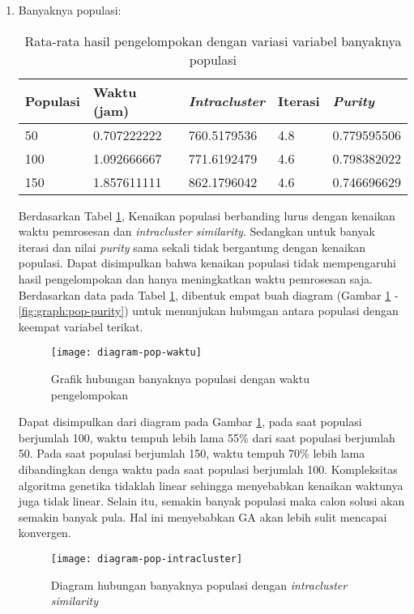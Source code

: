 \begin{enumerate}
	\item Banyaknya populasi:
		\begin{table}[H]
			\centering
			\begin{tabular}{|l|l|l|l|l|} \hline
				Populasi & Waktu (jam) & \textit{Intracluster} & Iterasi& \textit{Purity} \\ \hline
				50  & 0.707222222 & 760.5179536 & 4.8 & 0.779595506 \\ \hline
				100 & 1.092666667 & 771.6192479 & 4.6 & 0.798382022 \\ \hline
				150 & 1.857611111 & 862.1796042 & 4.6 & 0.746696629 \\ \hline
			\end{tabular}
			\caption{Rata-rata hasil pengelompokan dengan variasi variabel banyaknya populasi}
			\label{tbl:exp-pop}
		\end{table}
		
		Berdasarkan Tabel \ref{tbl:exp-pop}, Kenaikan populasi berbanding lurus dengan kenaikan waktu pemrosesan dan \textit{intracluster similarity}. Sedangkan untuk banyak iterasi dan nilai \textit{purity} sama sekali tidak bergantung dengan kenaikan populasi. Dapat disimpulkan bahwa kenaikan populasi tidak mempengaruhi hasil pengelompokan dan hanya meningkatkan waktu pemrosesan saja. Berdasarkan data pada Tabel \ref{tbl:exp-pop}, dibentuk empat buah diagram (Gambar \ref{fig:graph:pop-time} - \ref{fig:graph:pop-purity}) untuk menunjukan hubungan antara populasi dengan keempat variabel terikat.
		
		\begin{figure}[H]
			\centering
			\texttt{[image: diagram-pop-waktu]}
			\caption{Grafik hubungan banyaknya populasi dengan waktu pengelompokan}
			\label{fig:graph:pop-time}
		\end{figure}
		
		Dapat disimpulkan dari diagram pada Gambar \ref{fig:graph:pop-time}, pada saat populasi berjumlah 100, waktu tempuh lebih lama 55\% dari saat populasi berjumlah 50. Pada saat populasi berjumlah 150, waktu tempuh 70\% lebih lama dibandingkan denga waktu pada saat populasi berjumlah 100. Kompleksitas algoritma genetika tidaklah linear sehingga menyebabkan kenaikan waktunya juga tidak linear. Selain itu, semakin banyak populasi maka calon solusi akan semakin banyak pula. Hal ini menyebabkan GA akan lebih sulit mencapai konvergen.
		
		\begin{figure}[H]
			\centering
			\texttt{[image: diagram-pop-intracluster]}
			\caption{Diagram hubungan banyaknya populasi dengan \textit{intracluster similarity}}
			\label{fig:graph:pop-intra}
		\end{figure}
		

\end{enumerate}
